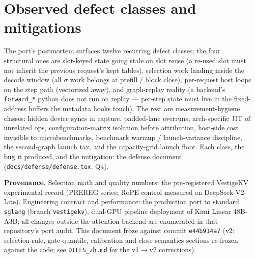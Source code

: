 \documentclass[11pt]{article}
\begin{document}
\section{Observed defect classes and mitigations}
\label{sec:pitfalls}

The port's postmortem surfaces twelve recurring defect classes; the four
structural ones are slot-keyed state going stale on slot reuse
(a re-used slot must not inherit the previous request's kept tables),
selection work landing inside the decode window (all $\sigma$ work belongs
at prefill / block close), per-request host loops on the step path
(vectorized away), and graph-replay reality (a backend's
\texttt{forward\_*} python does not run on replay --- per-step state must
live in the fixed-address buffers the metadata hooks touch). The rest are
measurement-hygiene classes: hidden device syncs in capture, padded-lane
overruns, arch-specific JIT of unrelated ops, configuration-matrix
isolation before attribution, host-side cost invisible to microbenchmarks,
benchmark warmup / launch-variance discipline, the second-graph launch tax,
and the capacity-grid launch floor. Each class, the bug it produced, and
the mitigation: the defense document
(\texttt{docs/defense/defense.tex}, Q4).

\vspace{1em}
\noindent\textbf{Provenance.} Selection math and quality numbers: the
pre-registered VestigeKV experimental record (PREREG series; RoPE control
measured on DeepSeek-V2-Lite). Engineering contract and performance:
the production port to standard \texttt{sglang}
(branch \texttt{vestigekv}), dual-GPU pipeline deployment of
Kimi Linear 48B-A3B; all changes outside the attention backend are
enumerated in that repository's port audit. This document froze against
commit \texttt{e44b914a7} (v2: selection-rule, gate-quantile, calibration
and close-semantics sections re-frozen against the code; see
\texttt{DIFFS\_zh.md} for the v1$\to$v2 corrections).
\end{document}
